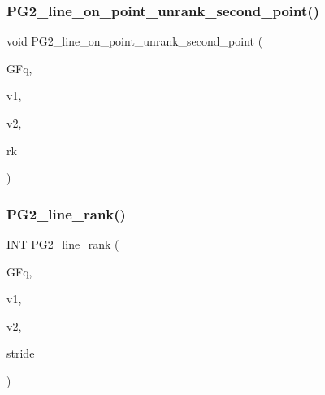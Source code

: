 \subsubsection{\texorpdfstring{P\+G2\+\_\+line\+\_\+on\+\_\+point\+\_\+unrank\+\_\+second\+\_\+point()}{PG2\_line\_on\_point\_unrank\_second\_point()}}
{\footnotesize\ttfamily void P\+G2\+\_\+line\+\_\+on\+\_\+point\+\_\+unrank\+\_\+second\+\_\+point (\begin{DoxyParamCaption}\item[{\mbox{\hyperlink{classfinite__field}{finite\+\_\+field}} \&}]{G\+Fq,  }\item[{\mbox{\hyperlink{galois_8h_a09fddde158a3a20bd2dcadb609de11dc}{I\+NT}} $\ast$}]{v1,  }\item[{\mbox{\hyperlink{galois_8h_a09fddde158a3a20bd2dcadb609de11dc}{I\+NT}} $\ast$}]{v2,  }\item[{\mbox{\hyperlink{galois_8h_a09fddde158a3a20bd2dcadb609de11dc}{I\+NT}}}]{rk }\end{DoxyParamCaption})}

\mbox{\label{projective_8_c_ad76afeb9423dbe34a94394e662bfc420}} 
\subsubsection{\texorpdfstring{P\+G2\+\_\+line\+\_\+rank()}{PG2\_line\_rank()}}
{\footnotesize\ttfamily \mbox{\hyperlink{galois_8h_a09fddde158a3a20bd2dcadb609de11dc}{I\+NT}} P\+G2\+\_\+line\+\_\+rank (\begin{DoxyParamCaption}\item[{\mbox{\hyperlink{classfinite__field}{finite\+\_\+field}} \&}]{G\+Fq,  }\item[{\mbox{\hyperlink{galois_8h_a09fddde158a3a20bd2dcadb609de11dc}{I\+NT}} $\ast$}]{v1,  }\item[{\mbox{\hyperlink{galois_8h_a09fddde158a3a20bd2dcadb609de11dc}{I\+NT}} $\ast$}]{v2,  }\item[{\mbox{\hyperlink{galois_8h_a09fddde158a3a20bd2dcadb609de11dc}{I\+NT}}}]{stride }\end{DoxyParamCaption})}

\mbox{\label{projective_8_c_a907b97154f1aee481a67be25b85d5165}} 
